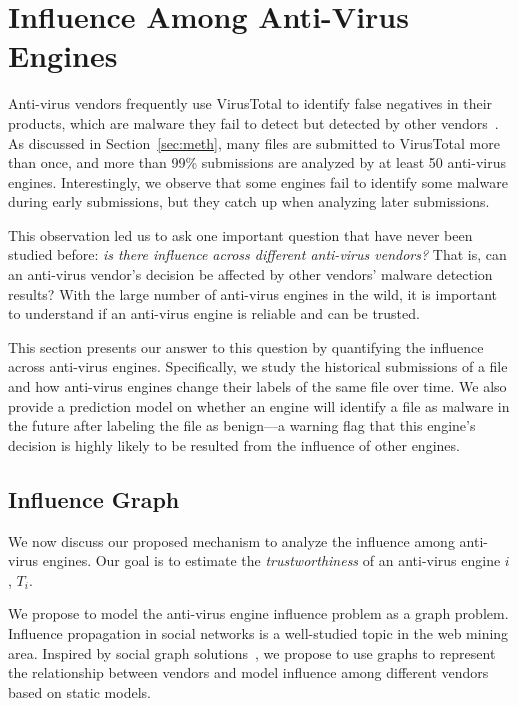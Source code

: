 \section{Influence Among Anti-Virus Engines}
\label{sec:influ}

Anti-virus vendors frequently use VirusTotal to identify false negatives in their products, 
which are malware they fail to detect but detected by other vendors~\cite{vt-usage}.
As discussed in Section~\ref{sec:meth}, many files are submitted to VirusTotal more than once, 
and more than 99\% submissions are analyzed by at least 50 anti-virus engines. 
Interestingly, we observe that some engines fail to identify some malware during early submissions, 
but they catch up when analyzing later submissions.

This observation led us to ask one important question that have never been studied before:
{\em is there influence across different anti-virus vendors?}
That is, can an anti-virus vendor's decision be affected by other vendors' malware detection results?
With the large number of anti-virus engines in the wild, it is important to understand if an anti-virus engine is
reliable and can be trusted.  

This section presents our answer to this question by quantifying the influence across anti-virus engines.
Specifically, we study the historical submissions of a file and
how anti-virus engines change their labels of the same file over time.
We also provide a prediction model on whether an engine will identify a file as malware in the future
after labeling the file as benign---a warning flag that this engine's decision is highly likely to be resulted from the influence of other engines.

\subsection{Influence Graph}
\label{sec:model}
We now discuss our proposed mechanism to analyze the influence among anti-virus engines.
Our goal is to estimate the {\em trustworthiness} of an anti-virus engine $i$, $T_i$.

We propose to model the anti-virus engine influence problem as a graph problem.
Influence propagation in social networks is a well-studied topic in the web mining area. 
Inspired by social graph solutions~\cite{Influence}, we propose to use graphs to represent the relationship between vendors 
and model influence among different vendors based on static models.

